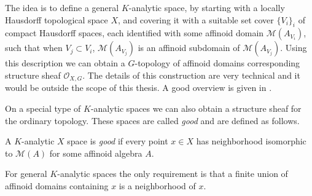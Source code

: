 The idea is to define a general  $K$-analytic space, by starting with a locally Hausdorff topological space $X$, and covering it with a suitable set cover $\{V_i\} _{i}$ of compact Hausdorff spaces, each identified with some affinoid domain $\mathcal{M} (A_{V_i})$, such that when $V_j \subset  V_i$, $ \mathcal{M} (A_{V_j})$ is an affinoid subdomain of $\mathcal{M} (A_{V_j})$. 
Using this description we can obtain a $G$-topology of affinoid domains corresponding structure sheaf $\mathcal{O}_{X, G}$.  
The details of this construction are very technical and it would be outside the scope of this thesis. 
A good overview is given in \cite[chap.\ 5]{conrad2008several}.

On a special type of $K$-analytic spaces we can also obtain a structure sheaf for the ordinary topology. 
These spaces are called \emph{good} and are defined as follows. 
\begin{definition}
	A $K$-analytic $X$ space is \emph{good} if every point $x \in X$ has neighborhood isomorphic to $\mathcal{M} (A)$ for some affinoid algebra $A$. 
\end{definition}
For general $K$-analytic spaces the only requirement is that a finite union of affinoid domains containing $x$ is a neighborhood of $x$. 





